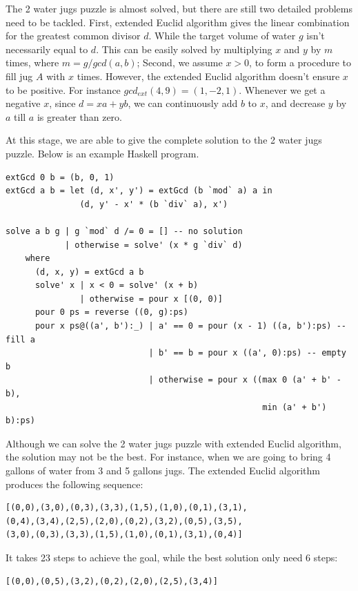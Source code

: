\documentclass[UTF8]{article}
\begin{document}
The 2 water jugs puzzle is almost solved, but there are still two detailed
problems need to be tackled. First, extended Euclid algorithm gives the linear
combination for the greatest common divisor $d$. While the target volume
of water $g$ isn't necessarily equal to $d$. This can be easily solved
by multiplying $x$ and $y$ by $m$ times, where $m = g / gcd(a, b)$;
Second, we assume $x>0$, to form a procedure to fill jug $A$ with $x$ times.
However, the extended Euclid algorithm doesn't ensure $x$ to be positive.
For instance $gcd_{ext}(4, 9) = (1, -2, 1)$. Whenever we get a negative
$x$, since $d = x a + y b$, we can continuously add $b$ to $x$, and decrease
$y$ by $a$ till $a$ is greater than zero.

At this stage, we are able to give the complete solution to the 2 water jugs
puzzle. Below is an example Haskell program.

\lstset{language=Haskell}
\begin{lstlisting}
extGcd 0 b = (b, 0, 1)
extGcd a b = let (d, x', y') = extGcd (b `mod` a) a in
               (d, y' - x' * (b `div` a), x')

solve a b g | g `mod` d /= 0 = [] -- no solution
            | otherwise = solve' (x * g `div` d)
    where
      (d, x, y) = extGcd a b
      solve' x | x < 0 = solve' (x + b)
               | otherwise = pour x [(0, 0)]
      pour 0 ps = reverse ((0, g):ps)
      pour x ps@((a', b'):_) | a' == 0 = pour (x - 1) ((a, b'):ps) -- fill a
                             | b' == b = pour x ((a', 0):ps) -- empty b
                             | otherwise = pour x ((max 0 (a' + b' - b),
                                                    min (a' + b') b):ps)
\end{lstlisting}

Although we can solve the 2 water jugs puzzle with extended Euclid algorithm, the
solution may not be the best. For instance, when we are going to bring 4 gallons
of water from 3 and 5 gallons jugs. The extended Euclid algorithm produces the
following sequence:

\begin{verbatim}
[(0,0),(3,0),(0,3),(3,3),(1,5),(1,0),(0,1),(3,1),
(0,4),(3,4),(2,5),(2,0),(0,2),(3,2),(0,5),(3,5),
(3,0),(0,3),(3,3),(1,5),(1,0),(0,1),(3,1),(0,4)]
\end{verbatim}

It takes 23 steps to achieve the goal, while the best solution only need 6 steps:

\begin{verbatim}
[(0,0),(0,5),(3,2),(0,2),(2,0),(2,5),(3,4)]
\end{verbatim}
\end{document}
